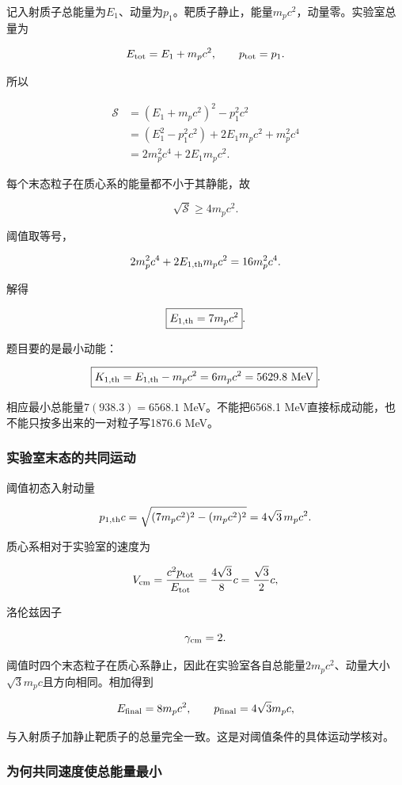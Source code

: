 \documentclass[12pt,a4paper,fontset=fandol]{ctexart}
\begin{document}
记入射质子总能量为\(E_1\)、动量为\(p_1\)。靶质子静止，能量\(m_pc^2\)，动量零。实验室总量为

\[
E_{\rm tot}=E_1+m_pc^2,\qquad
p_{\rm tot}=p_1.
\]

所以

\[
\begin{aligned}
\mathcal S
&=(E_1+m_pc^2)^2-p_1^2c^2\\
&=(E_1^2-p_1^2c^2)+2E_1m_pc^2+m_p^2c^4\\
&=2m_p^2c^4+2E_1m_pc^2.
\end{aligned}
\]

每个末态粒子在质心系的能量都不小于其静能，故

\[
\sqrt{\mathcal S}\geq4m_pc^2.
\]

阈值取等号，

\[
2m_p^2c^4+2E_{1,\rm th}m_pc^2
=16m_p^2c^4.
\]

解得

\[
\boxed{E_{1,\rm th}=7m_pc^2}.
\]

题目要的是最小动能：

\[
\boxed{
K_{1,\rm th}=E_{1,\rm th}-m_pc^2
=6m_pc^2=5629.8\ \mathrm{MeV}}.
\]

相应最小总能量\(7(938.3)=6568.1\) MeV。不能把6568.1
MeV直接标成动能，也不能只按多出来的一对粒子写1876.6 MeV。

\subsubsection{实验室末态的共同运动}\label{ux5b9eux9a8cux5ba4ux672bux6001ux7684ux5171ux540cux8fd0ux52a8}

阈值初态入射动量

\[
p_{1,\rm th}c=
\sqrt{(7m_pc^2)^2-(m_pc^2)^2}
=4\sqrt3\,m_pc^2.
\]

质心系相对于实验室的速度为

\[
V_{\rm cm}=\frac{c^2p_{\rm tot}}{E_{\rm tot}}
=\frac{4\sqrt3}{8}c
=\frac{\sqrt3}{2}c,
\]

洛伦兹因子

\[
\gamma_{\rm cm}=2.
\]

阈值时四个末态粒子在质心系静止，因此在实验室各自总能量\(2m_pc^2\)、动量大小\(\sqrt3m_pc\)且方向相同。相加得到

\[
E_{\rm final}=8m_pc^2,\qquad
p_{\rm final}=4\sqrt3m_pc,
\]

与入射质子加静止靶质子的总量完全一致。这是对阈值条件的具体运动学核对。

\subsubsection{为何共同速度使总能量最小}\label{ux4e3aux4f55ux5171ux540cux901fux5ea6ux4f7fux603bux80fdux91cfux6700ux5c0f}
\end{document}
